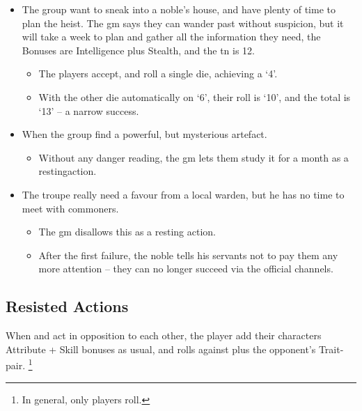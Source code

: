\begin{multicols}{2}
\begin{exampletext}
\begin{itemize}
  \item
  The group want to sneak into a noble's house, and have plenty of time to plan the heist.
  The \gls{gm} says they can wander past without suspicion, but it will take a week to plan and gather all the information they need, the Bonuses are Intelligence plus Stealth, and the \gls{tn} is 12.
    \begin{itemize}
    \item
    The players accept, and roll a single die, achieving a `4'.
    \item
    With the other die automatically on `6', their roll is `10', and the total is `13' -- a narrow success.
    \end{itemize}
  \item
  When the group find a powerful, but mysterious artefact.
  \begin{itemize}
    \item
    Without any danger reading, the \gls{gm} lets them study it for a month as a \gls{restingaction}.
  \end{itemize}
  \item
    The troupe really need a favour from a local warden, but he has no time to meet with commoners.
  \begin{itemize}
    \item
    The \gls{gm} disallows this as a resting action.
    \item
    After the first failure, the noble tells his servants not to pay them any more attention -- they can no longer succeed via the official channels.
  \end{itemize}

\end{itemize}
\end{exampletext}

\subsection{Resisted Actions}
\label{resistedactions}

When  and  act in opposition to each other, the player add their characters Attribute + Skill bonuses as usual, and rolls against \tn[7] plus the opponent's Trait-pair.%
\footnote{In general, only players roll.}


\end{multicols}
